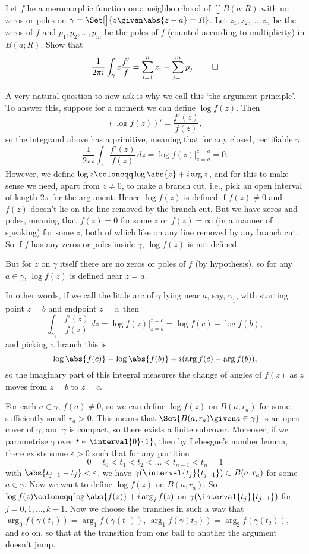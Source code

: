 \begin{exercise}
	Let $f$ be a meromorphic function on a neighbourhood of $\closure{B(a; R)}$ with no zeros or poles on $\gamma = \Set[\big]{z \given \abs{z - a} = R}$.
	Let $z_1, z_2, \dots, z_n$ be the zeros of $f$ and $p_1, p_2, \dots, p_m$ be the poles of $f$ (counted according to multiplicity) in $B(a; R)$.
	Show that
	\[
		\frac{1}{2 \pi i} \int_\gamma z \frac{f'}{f} = \sum_{i = 1}^n z_i - \sum_{j = 1}^m p_j. \qedhere
	\]
\end{exercise}

A very natural question to now ask is why we call this `the argument principle'.
To answer this, suppose for a moment we can define $\log f(z)$.
Then
\[
	(\log f(z))' = \frac{f'(z)}{f(z)},
\]
so the integrand above has a primitive, meaning that for any closed, rectifiable $\gamma$,
\[
	\frac{1}{2 \pi i} \int_\gamma \frac{f'(z)}{f(z)} \, d z = \log f(z) \biggr\rvert_{z = a}^{z = a} = 0.
\]
However, we define $\log z \coloneqq \log\abs{z} + i \arg z$, and for this to make sense we need, apart from $z \neq 0$, to make a branch cut, i.e., pick an open interval of length $2 \pi$ for the argument.
Hence $\log f(z)$ is defined if $f(z) \neq 0$ and $f(z)$ doesn't lie on the line removed by the branch cut.
But we have zeros and poles, meaning that $f(z) = 0$ for some $z$ or $f(z) = \infty$ (in a manner of speaking) for some $z$, both of which like on any line removed by any branch cut.
So if $f$ has any zeros or poles inside $\gamma$, $\log f(z)$ is not defined.

But for $z$ on $\gamma$ itself there are no zeros or poles of $f$ (by hypothesis), so for any $a \in \gamma$, $\log f(z)$ is defined near $z = a$.

In other words, if we call the little arc of $\gamma$ lying near $a$, say, $\gamma_1$, with starting point $z = b$ and endpoint $z = c$, then
\[
	\int_{\gamma_1} \frac{f'(z)}{f(z)} \, d z = \log f(z) \biggr\rvert_{z = b}^{z = c} = \log f(c) - \log f(b),
\]
and picking a branch this is
\[
	\log \abs{f(c)} - \log \abs{f(b)} + i (\arg f(c) - \arg f(b)),
\]
so the imaginary part of this integral measures the change of angles of $f(z)$ as $z$ moves from $z = b$ to $z = c$.

For each $a \in \gamma$, $f(a) \neq 0$, so we can define $\log f(z)$ on $B(a, r_a)$ for some sufficiently small $r_a > 0$.
This means that $\Set{B(a, r_a) \given a \in \gamma}$ is an open cover of $\gamma$, and $\gamma$ is compact, so there exists a finite subcover.
Moreover, if we parametrise $\gamma$ over $t \in \interval{0}{1}$, then by Lebesgue's number lemma, there exists some $\varepsilon > 0$ such that for any partition
\[
	0 = t_0 < t_1 < t_2 < \dots < t_{n - 1} < t_n = 1
\]
with $\abs{t_{j - 1} - t_j} < \varepsilon$, we have $\gamma(\interval{t_j}{t_{j - 1}}) \subset B(a, r_a)$ for some $a \in \gamma$.
Now we want to define $\log f(z)$ on $B(a, r_a)$.
So $\log f(z) \coloneqq \log \abs{f(z)} + i \arg_j f(z)$ on $\gamma(\interval{t_j}{t_{j + 1}})$ for $j = 0, 1, \dots, k - 1$.
Now we choose the branches in such a way that $\arg_0 f(\gamma(t_1)) = \arg_1 f(\gamma(t_1))$, $\arg_1 f(\gamma(t_2)) = \arg_2 f(\gamma(t_2))$, and so on, so that at the transition from one ball to another the argument doesn't jump.

